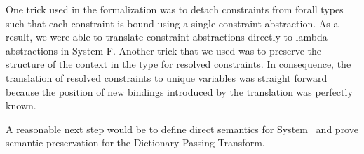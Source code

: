 \noindent One trick used in the formalization was to detach constraints from forall types such that each constraint is bound using a single constraint abstraction. As a result, we were able to translate constraint abstractions directly to lambda abstractions in System F. Another trick that we used was to preserve the structure of the context in the type for resolved constraints. In consequence, the translation of resolved constraints to unique variables was straight forward because the position of new bindings introduced by the translation was perfectly known.   

\noindent A reasonable next step would be to define direct semantics for System \Fo\ and prove semantic preservation for the Dictionary Passing Transform. 
